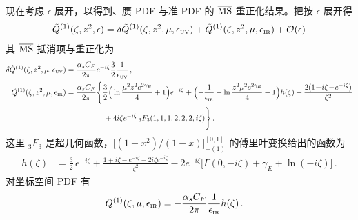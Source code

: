 \begin{widetext}
现在考虑 $\epsilon$ 展开，以得到\spcorr、赝 PDF 与准 PDF 的 $\overline{\rm MS}$ 重正化结果。把\spcorr 按 $\epsilon$ 展开得
\begin{align}
 \tilde{Q}^{(1)}(\zeta,z^2,\epsilon)=\delta \tilde{Q}^{(1)}(\zeta,z^2,\mu,\epsilon_{\mbox{\tiny UV}})+\tilde{Q}^{(1)}(\zeta,z^2,\mu,\epsilon_{\mbox{\tiny IR}})+{\cal O}(\epsilon)
\end{align}
其 $\overline{\rm MS}$ 抵消项与重正化\spcorr 为
\begin{align} \label{eq:1loopiofferen}
\delta \tilde{Q}^{(1)}(\zeta,z^2,\mu,\epsilon_{\mbox{\tiny UV}})
&= {\alpha_sC_F\over 2\pi}
  e^{-i\zeta} {3\over2}  {1\over \epsilon_{\mbox{\tiny UV}}}
 \,, \\
\tilde{Q}^{(1)}(\zeta,z^2,\mu,\epsilon_{\mbox{\tiny IR}})
&= {\alpha_sC_F\over 2\pi} \Bigg\{
  \frac{3}{2} \Big(\ln{\mu^2 z^2 e^{2\gamma_E} \over 4} +1\Big) e^{-i\zeta}
  + \Bigl( -\frac{1}{ \epsilon_{\mbox{\tiny IR}} } - \ln\frac{z^2\mu^2e^{2\gamma_E}}{4} - 1 \Bigr) h(\zeta)
  + \frac{2(1 \!-\!i\zeta\!-\! e^{-i\zeta})}{\zeta^2}
  \nonumber\\
&\qquad\qquad\quad
  + 4 i \zeta e^{-i\zeta}\, {}_3F_3(1,1,1,2,2,2,i\zeta)
  \Bigg\}
  \,. \nonumber
\end{align}
这里 ${}_3F_3$ 是超几何函数，$\big[(1+x^2)/(1-x)\big]_{+(1)}^{[0,1]}$ 的傅里叶变换给出的函数为
\begin{align}
  h(\zeta) &=\frac{3}{2}\, e^{-i\zeta}
  + \frac{1+i\zeta-e^{-i\zeta}-2i\zeta e^{-i\zeta}}{\zeta^2}
  - 2 e^{-i\zeta} \big[ \Gamma(0,-i\zeta)\!+\!\gamma_E\!+\!\ln(-i\zeta) \big]
  \,.
\end{align}
对坐标空间 PDF 有
\begin{align}
  Q^{(1)}(\zeta,\mu,\epsilon_{\mbox{\tiny IR}})
  &= -  {\alpha_sC_F\over 2\pi}  \frac{1}{  \epsilon_{\mbox{\tiny IR}} }  h(\zeta) \,.
\end{align}


\end{widetext}
